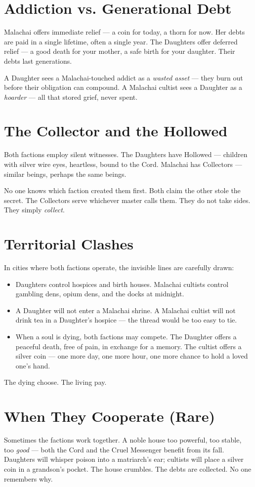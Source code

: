 \documentclass[10pt,twoside]{book}
\begin{document}
\section{Addiction vs. Generational Debt}
Malachai offers immediate relief --- a coin for today, a thorn for now. Her debts are paid in a single lifetime, often a single year. The Daughters offer deferred relief --- a good death for your mother, a safe birth for your daughter. Their debts last generations.

A Daughter sees a Malachai-touched addict as a \textit{wasted asset} --- they burn out before their obligation can compound. A Malachai cultist sees a Daughter as a \textit{hoarder} --- all that stored grief, never spent.

\section{The Collector and the Hollowed}
Both factions employ silent witnesses. The Daughters have Hollowed --- children with silver wire eyes, heartless, bound to the Cord. Malachai has Collectors --- similar beings, perhaps the same beings.

No one knows which faction created them first. Both claim the other stole the secret. The Collectors serve whichever master calls them. They do not take sides. They simply \textit{collect}.

\section{Territorial Clashes}
In cities where both factions operate, the invisible lines are carefully drawn:
\begin{itemize}
\item Daughters control hospices and birth houses. Malachai cultists control gambling dens, opium dens, and the docks at midnight.
\item A Daughter will not enter a Malachai shrine. A Malachai cultist will not drink tea in a Daughter's hospice --- the thread would be too easy to tie.
\item When a soul is dying, both factions may compete. The Daughter offers a peaceful death, free of pain, in exchange for a memory. The cultist offers a silver coin --- one more day, one more hour, one more chance to hold a loved one's hand.
\end{itemize}
The dying choose. The living pay.

\section{When They Cooperate (Rare)}
Sometimes the factions work together. A noble house too powerful, too stable, too \textit{good} --- both the Cord and the Cruel Messenger benefit from its fall. Daughters will whisper poison into a matriarch's ear; cultists will place a silver coin in a grandson's pocket. The house crumbles. The debts are collected. No one remembers why.
\end{document}

